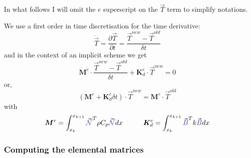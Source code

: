 In what follows I will omit the $e$ superscript on the $\vec{T}$ term to simplify notations. 

We use a first order in time discretisation for the time derivative:
\[
\dot{\vec T}= \frac{\partial {\vec T}}{\partial t} = \frac{{\vec T}^{new}-{\vec T}^{old}}{\delta t}
\]
and in the context of an implicit scheme we get
\[
{\bm M}^e \cdot \frac{{\vec T}^{new}-{\vec T}^{old}}{\delta t} + {\bm K}_d^e \cdot {\vec T}^{new} = 0
\]
or, 
\[
\boxed{
( {\bm M}^e +  {\bm K}_d^e  \delta t ) \cdot {\vec T}^{new} =  {\bm M}^e \cdot  {\vec T}^{old}
}
\]
with 
\[
{\bm M}^e=  \int_{x_k}^{x_{k+1}}   {\vec {\color{Violet}\bN}}^T \rho C_p {\vec {\color{Violet}\bN}} dx  
\quad\quad\quad
{\bm K}_d^e =
 \int_{x_k}^{x_{k+1}}   {\vec {\color{Violet}B}}^T k {\vec {\color{Violet}B}} dx 
\]

\subsubsection{Computing the elemental matrices}


